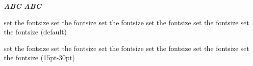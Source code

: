 \documentclass{ctexart}
\begin{document}
            {\sffamily\large\bfseries\itshape ABC \normalsize\normalfont ABC}

            set the fontsize set the fontsize set the fontsize set the fontsize set the fontsize set the fontsize (default)

            {}

            {\fontsize{15}{30}\selectfont set the fontsize set the fontsize set the fontsize set the fontsize set the fontsize set the fontsize (15pt-30pt)\par}
\end{document}
